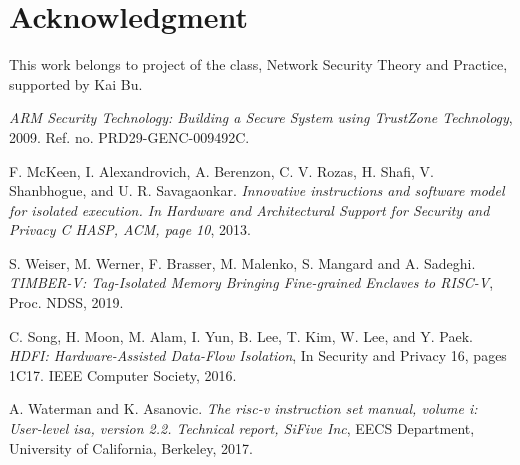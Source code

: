 \documentclass[conference]{IEEEtran}
\begin{document}
\section*{Acknowledgment}
This work belongs to project of the class, Network Security Theory and Practice, supported by Kai Bu.



\begin{thebibliography}{1}

\emph{ARM Security Technology: Building a Secure System using TrustZone Technology}, 2009. Ref. no. PRD29-GENC-009492C.

F. McKeen, I. Alexandrovich, A. Berenzon, C. V. Rozas, H. Shafi, V. Shanbhogue, and U. R. Savagaonkar.
\emph{Innovative instructions and software model for isolated execution. In Hardware and Architectural
Support for Security and Privacy C HASP, ACM, page 10}, 2013. 

S. Weiser, M. Werner, F. Brasser, M. Malenko, S. Mangard and A. Sadeghi.
\emph{TIMBER-V: Tag-Isolated Memory Bringing Fine-grained Enclaves to RISC-V},
Proc. NDSS, 2019.

C. Song, H. Moon, M. Alam, I. Yun, B. Lee, T. Kim, W. Lee, and Y. Paek. 
\emph{HDFI: Hardware-Assisted Data-Flow Isolation},
In Security and Privacy 16, pages 1C17. IEEE Computer Society, 2016.

A. Waterman and K. Asanovic. 
\emph{The risc-v instruction set manual,
volume i: User-level isa, version 2.2. Technical report, SiFive Inc},
EECS Department, University of California, Berkeley, 2017.

\end{thebibliography}
\end{document}
